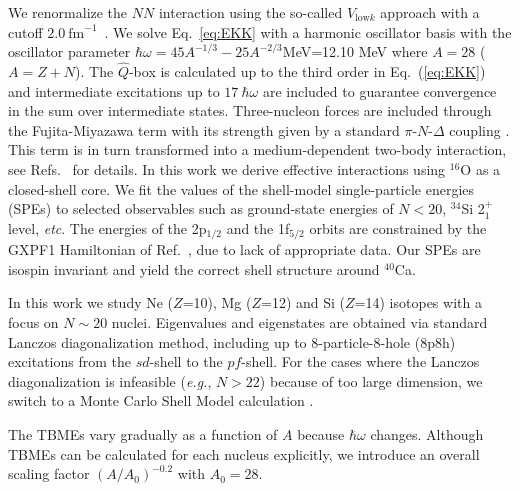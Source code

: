 \documentclass[aps,prl,twocolumn,groupedaddress,showkeys,showpacs,floatfix,superscriptaddress]{revtex4-1}
\newcommand\Vlowk{V_{\mathrm{low}k}}
\newcommand\fmi{\mathrm{fm}^{-1}}
\newcommand\+{^\dagger}
\newcommand\Qbox{$\hat{Q}$-box }
\newcommand\hw{\hbar\omega}
\begin{document}
We renormalize the $NN$ interaction using the so-called $\Vlowk$ approach with a cutoff
$2.0~\fmi$~\cite{Entem:2003hx,PhysRevC.65.051301,PhysRevC.70.061002}.
We solve Eq.~\eqref{eq:EKK} with a  harmonic oscillator basis with the oscillator parameter 
$\hw=45 A^{-1/3} - 25 A^{-2/3}$MeV=12.10 MeV where $A=28$ ($A=Z+N$).  
The \Qbox is calculated up to the third order in Eq.~(\ref{eq:EKK}) 
and intermediate excitations up to $17~\hw$
are included to guarantee convergence in the sum over intermediate
states.  Three-nucleon forces are included through the Fujita-Miyazawa
term with its strength given by a standard $\pi$-$N$-$\Delta$ coupling  
\cite{greenRepProgPhys}. 
This term is in turn  transformed into a medium-dependent two-body
interaction, see  
Refs.~\cite{PhysRevLett.105.032501,Holt:2013jk,Holt:2014uc} for details. 
In this work we derive effective interactions using $^{16}$O as a closed-shell core. We fit the values of the 
shell-model single-particle energies (SPEs) to selected 
observables such as ground-state energies of $N<20$, $^{34}$Si 2$_1^+$ level, {\it etc}.  
The energies of the 2p$_{1/2}$ and the 1f$_{5/2}$ orbits are constrained
by the GXPF1 Hamiltonian of Ref.~\cite{PhysRevC.65.061301}, due to lack of 
appropriate data. Our SPEs are isospin invariant and yield the correct shell structure
around $^{40}$Ca.  


In this work we study Ne ($Z$=10), Mg ($Z$=12) and Si ($Z$=14) isotopes
with a focus on $N\sim20$ nuclei.
Eigenvalues and eigenstates are obtained via standard Lanczos diagonalization method, 
including up to 8-particle-8-hole (8p8h)  
excitations from the $sd$-shell to the $pf$-shell. 
For the cases where the Lanczos diagonalization is infeasible ({\it e.g.}, $N>22$) because of 
too large dimension, we switch to a Monte Carlo Shell Model calculation \cite{Otsuka:2001gx,Shimizu:2012dh}. 

The TBMEs vary gradually as a function of $A$ because $\hw$ changes.  
Although TBMEs can be calculated for each nucleus explicitly,  
we introduce an overall scaling factor $(A/A_0)^{-0.2}$ with  
$A_0=28$.  
\end{document}
